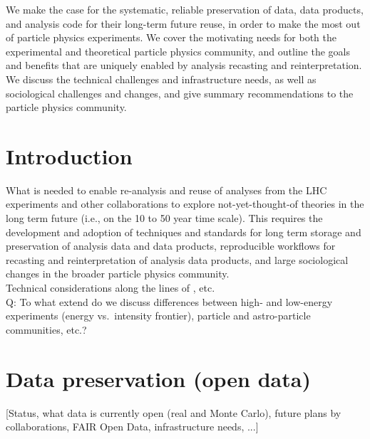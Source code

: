 \documentclass[11pt]{article}
\begin{document}
\begin{Abstract}
\noindent We make the case for the systematic, reliable preservation of data, data products, and analysis code for their long-term future reuse, in order to make the most out of particle physics experiments.
We cover the motivating needs for both the experimental and theoretical particle physics community, and outline the goals and benefits that are uniquely enabled by analysis recasting and reinterpretation. 
We discuss the technical challenges and infrastructure needs, as well as sociological challenges and changes, and give summary recommendations to the particle physics community.
\end{Abstract}

\clearpage

\section{Introduction}

What is needed to enable re-analysis and reuse of analyses from the LHC experiments and other collaborations to explore not-yet-thought-of theories in the long term future (i.e., on the 10 to 50 year time scale).
This requires the development and adoption of techniques and standards for long term storage and preservation of analysis data and data products, reproducible workflows for recasting and reinterpretation of analysis data products, and large sociological changes in the broader particle physics community.\\
Technical considerations along the lines of \cite{LHCReinterpretationForum:2020xtr,Cranmer:2021urp}, etc. \\

Q: To what extend do we discuss differences between high- and low-energy experiments (energy vs.\ intensity frontier), particle and astro-particle communities, etc.? 


\section{Data preservation (open data)}

[Status, what data is currently open (real and Monte Carlo), future plans by collaborations, FAIR Open Data, infrastructure needs, ...]
\end{document}
